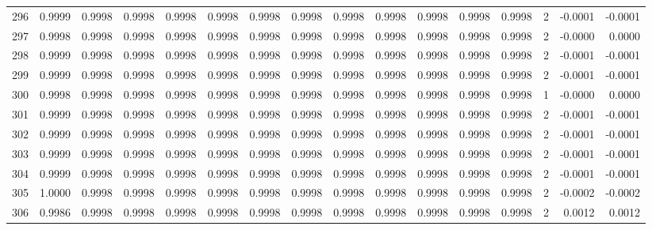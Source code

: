 \begin{tabular}{lrrrrrrrrrrrrrrr}
296 &      0.9999 &  0.9998 &  0.9998 &  0.9998 &  0.9998 &  0.9998 &  0.9998 &  0.9998 &  0.9998 &  0.9998 &   0.9998 &     0.9998 &      2 &                   -0.0001 &                    -0.0001 \\
297 &      0.9998 &  0.9998 &  0.9998 &  0.9998 &  0.9998 &  0.9998 &  0.9998 &  0.9998 &  0.9998 &  0.9998 &   0.9998 &     0.9998 &      2 &                   -0.0000 &                     0.0000 \\
298 &      0.9999 &  0.9998 &  0.9998 &  0.9998 &  0.9998 &  0.9998 &  0.9998 &  0.9998 &  0.9998 &  0.9998 &   0.9998 &     0.9998 &      2 &                   -0.0001 &                    -0.0001 \\
299 &      0.9999 &  0.9998 &  0.9998 &  0.9998 &  0.9998 &  0.9998 &  0.9998 &  0.9998 &  0.9998 &  0.9998 &   0.9998 &     0.9998 &      2 &                   -0.0001 &                    -0.0001 \\
300 &      0.9998 &  0.9998 &  0.9998 &  0.9998 &  0.9998 &  0.9998 &  0.9998 &  0.9998 &  0.9998 &  0.9998 &   0.9998 &     0.9998 &      1 &                   -0.0000 &                     0.0000 \\
301 &      0.9999 &  0.9998 &  0.9998 &  0.9998 &  0.9998 &  0.9998 &  0.9998 &  0.9998 &  0.9998 &  0.9998 &   0.9998 &     0.9998 &      2 &                   -0.0001 &                    -0.0001 \\
302 &      0.9999 &  0.9998 &  0.9998 &  0.9998 &  0.9998 &  0.9998 &  0.9998 &  0.9998 &  0.9998 &  0.9998 &   0.9998 &     0.9998 &      2 &                   -0.0001 &                    -0.0001 \\
303 &      0.9999 &  0.9998 &  0.9998 &  0.9998 &  0.9998 &  0.9998 &  0.9998 &  0.9998 &  0.9998 &  0.9998 &   0.9998 &     0.9998 &      2 &                   -0.0001 &                    -0.0001 \\
304 &      0.9999 &  0.9998 &  0.9998 &  0.9998 &  0.9998 &  0.9998 &  0.9998 &  0.9998 &  0.9998 &  0.9998 &   0.9998 &     0.9998 &      2 &                   -0.0001 &                    -0.0001 \\
305 &      1.0000 &  0.9998 &  0.9998 &  0.9998 &  0.9998 &  0.9998 &  0.9998 &  0.9998 &  0.9998 &  0.9998 &   0.9998 &     0.9998 &      2 &                   -0.0002 &                    -0.0002 \\
306 &      0.9986 &  0.9998 &  0.9998 &  0.9998 &  0.9998 &  0.9998 &  0.9998 &  0.9998 &  0.9998 &  0.9998 &   0.9998 &     0.9998 &      2 &                    0.0012 &                     0.0012 \\

\end{tabular}
